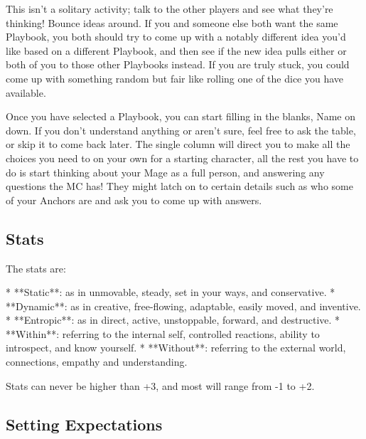 \documentclass[
  oneside,
  statementpaper,
  9pt]{memoir}
\begin{document}
\begin{Player}
This isn't a solitary activity; talk to the other players and see what they're thinking! Bounce ideas around. If you and someone else both want the same Playbook, you both should try to come up with a notably different idea you'd like based on a different Playbook, and then see if the new idea pulls either or both of you to those other Playbooks instead. If you are truly stuck, you could come up with something random but fair like rolling one of the dice you have available.

Once you have selected a Playbook, you can start filling in the blanks, Name on down. If you don't understand anything or aren't sure, feel free to ask the table, or skip it to come back later. The single column will direct you to make all the choices you need to on your own for a starting character, all the rest you have to do is start thinking about your Mage as a full person, and answering any questions the MC has! They might latch on to certain details such as who some of your Anchors are and ask you to come up with answers.

\end{Player}

\hypertarget{stats-1}{%
\subsection{Stats}\label{stats-1}}

\begin{Narrator}

The stats are:

* **Static**: as in unmovable, steady, set in your ways, and conservative.
* **Dynamic**: as in creative, free-flowing, adaptable, easily moved, and inventive.
* **Entropic**: as in direct, active, unstoppable, forward, and destructive.
* **Within**: referring to the internal self, controlled reactions, ability to introspect, and know yourself.
* **Without**: referring to the external world, connections, empathy and understanding.

Stats can never be higher than +3, and most will range from -1 to +2.

\end{Narrator}

\hypertarget{setting-expectations}{%
\subsection{Setting Expectations}\label{setting-expectations}}
\end{document}
